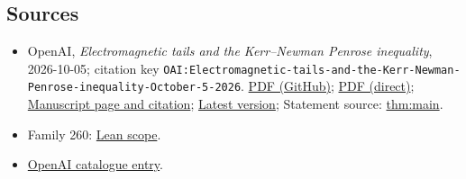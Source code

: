 \documentclass[11pt]{article}
\begin{document}
\subsection{Sources}
\begin{itemize}
\item OpenAI, \emph{Electromagnetic tails and the Kerr–Newman Penrose inequality}, 2026-10-05; citation key \texttt{OAI:Electromagnetic-tails-and-the-Kerr-Newman-Penrose-inequality-October-5-2026}. \href{https://github.com/openai/math/blob/adc7f1241b42e322a6451854ab7e4b4c146bf78a/preprints/Electromagnetic-tails-and-the-Kerr-Newman-Penrose-inequality-October-5-2026/paper.pdf}{PDF (GitHub)}; \href{https://github.com/openai/math/raw/adc7f1241b42e322a6451854ab7e4b4c146bf78a/preprints/Electromagnetic-tails-and-the-Kerr-Newman-Penrose-inequality-October-5-2026/paper.pdf}{PDF (direct)}; \href{https://github.com/openai/math/blob/adc7f1241b42e322a6451854ab7e4b4c146bf78a/preprints/Electromagnetic-tails-and-the-Kerr-Newman-Penrose-inequality-October-5-2026/README.md}{Manuscript page and citation}; \href{https://github.com/openai/math/blob/main/preprints/Electromagnetic-tails-and-the-Kerr-Newman-Penrose-inequality-October-5-2026/paper.pdf}{Latest version}; Statement source: \href{https://github.com/openai/math/blob/adc7f1241b42e322a6451854ab7e4b4c146bf78a/preprints/Electromagnetic-tails-and-the-Kerr-Newman-Penrose-inequality-October-5-2026/build/sections/00-introduction.tex\#L145}{thm:main}.
\item Family 260: \href{https://github.com/openai/math/blob/adc7f1241b42e322a6451854ab7e4b4c146bf78a/lean/docs/260.md}{Lean scope}.
\item \href{https://github.com/openai/math/blob/adc7f1241b42e322a6451854ab7e4b4c146bf78a/CONTENTS.md}{OpenAI catalogue entry}.
\end{itemize}
\end{document}
